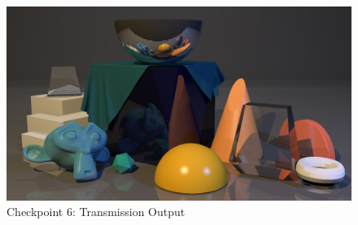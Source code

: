 \documentclass[a4paper]{report}
\begin{document}
\begin{figure}[H]
    \begin{adjustbox}{lap=-1.5cm}
        \includegraphics[width=1.2\textwidth]{chkpt6.png}
    \end{adjustbox}
    \caption{Checkpoint 6: Transmission Output}
    \label{fig:chkpt6}
\end{figure}
\end{document}
